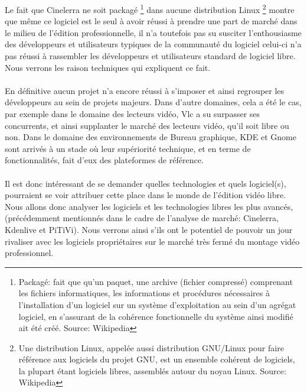 
Le fait que Cinelerra ne soit packagé \footnote{Packagé: fait
que qu'un paquet, une archive (fichier compressé) comprenant les
fichiers informatiques, les informations et procédures nécessaires
à l'installation d'un logiciel sur un système d'exploitation au sein
d'un agrégat logiciel, en s'assurant de la cohérence fonctionnelle
du système ainsi modifié ait été créé. Source: Wikipedia} dans
aucune distribution Linux \footnote {Une distribution Linux, appelée
aussi distribution GNU/Linux pour faire référence aux logiciels du
projet GNU, est un ensemble cohérent de logiciels, la plupart étant
logiciels libres, assemblés autour du noyau Linux. Source: Wikipedia}
montre que même ce logiciel est le seul à avoir réussi à prendre
une part de marché dans le milieu de l'édition professionnelle,
il n'a toutefois pas su susciter l'enthousiasme des développeurs et
utilisateurs typiques de la communauté du logiciel celui-ci n'a pas
réussi à rassembler les développeurs et utilisateurs standard de
logiciel libre. Nous verrons les raison techniques qui expliquent ce fait.

\paragraph{}

En définitive aucun projet n'a encore réussi à s'imposer et ainsi
regrouper les développeurs au sein de projets majeurs. Dans d'autre
domaines, cela a été le cas, par exemple dans le domaine des lecteurs
vidéo, Vlc a su surpasser ses concurrents, et ainsi supplanter le
marché des lecteurs vidéo, qu'il soit libre ou non. Dans le domaine
des environnements de Bureau graphique, KDE et Gnome sont arrivés à un
stade où leur supériorité technique, et en terme de fonctionnalités,
fait d'eux des plateformes de référence.

\paragraph{}

Il est donc intéressant de se demander quelles technologies et quels
logiciel(s), pourraient se voir attribuer cette place dans le monde
de l'édition vidéo libre. Nous allons donc analyser les logiciels et
les technologies libres les plus avancés, (précédemment mentionnés
dans le cadre de l'analyse de marché: Cinelerra, Kdenlive et PiTiVi).
Nous verrons ainsi s'ils ont le potentiel de pouvoir un jour rivaliser
avec les logiciels propriétaires sur le marché très fermé du montage
vidéo professionnel.

